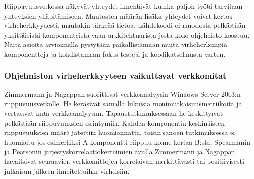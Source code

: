 \documentclass[finnish]{../tktltiki2}
\theoremstyle{definition}
\theoremstyle{remark}
\begin{document}
    Riippuvuusverkossa näkyvät yhteydet ilmentävät kuinka paljon työtä tarvitaan yhteyksien ylläpitämiseen. Muutosten 
määrän lisäksi yhteydet voivat kertoa virheherkkyydestä muutakin tärkeää tietoa. Lähdekoodi ei muodosta pelkästään 
yksittäisistä komponenteista vaan arkkitehtuurista josta koko ohjelmisto koostuu. Näitä asioita arvioimalla pystytään 
paikallistamaan muita virheherkempiä komponentteja ja kohdistamaan fokus testejä ja koodikatselmusta varten.

\subsubsection{Ohjelmiston virheherkkyyteen vaikuttavat verkkomitat}

    Zimmermann ja Nagappan suorittivat verkkoanalyysin Windows Server 2003:n riippuvuusverkolle. He keräsivät samalla 
lukuisia monimutkaisuusmetriikoita ja vertasivat niitä verkkoanalyysiin. Tapaustutkimuksessaan he keskittyivät 
pelkästään riippuvuuksien esiintymiin. Kahden komponentin keskinäisten riippuvuuksien määrä jätettiin huomioimatta, 
toisin sanoen tutkimuksessa ei huomioitu jos esimerkiksi A komponentti riippuu kolme kertaa B:stä. Spearmanin ja 
Pearsonin järjestyskorrelaatiokertoimien avulla Zimmermann ja Nagappan havaitsivat seuraavien verkkomittojen korreloivan 
merkittävästi tai positiivisesti julkaisun jälkeen ilmoitettuihin virheisiin.
\end{document}

